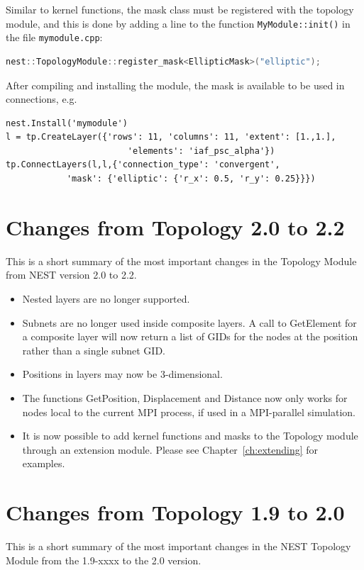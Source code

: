 \documentclass[a4paper,12pt]{report}
\begin{document}
Similar to kernel functions, the mask class must be registered with the
topology module, and this is done by adding a line to the function
\lstinline!MyModule::init()! in the file \lstinline!mymodule.cpp!:
\begin{lstlisting}[language=C++]
    nest::TopologyModule::register_mask<EllipticMask>("elliptic");
\end{lstlisting}
After compiling and installing the module, the mask is available to be used
in connections, e.g.
\begin{lstlisting}
nest.Install('mymodule')
l = tp.CreateLayer({'rows': 11, 'columns': 11, 'extent': [1.,1.],
                        'elements': 'iaf_psc_alpha'})
tp.ConnectLayers(l,l,{'connection_type': 'convergent',
            'mask': {'elliptic': {'r_x': 0.5, 'r_y': 0.25}}})
\end{lstlisting}


\chapter{Changes from Topology 2.0 to 2.2}\label{sec:changes}

This is a short summary of the most important changes in the Topology
Module from NEST version 2.0 to 2.2.

\begin{itemize}
\item Nested layers are no longer supported.
\item Subnets are no longer used inside composite layers. A call to
  GetElement for a composite layer will now return a list of GIDs for the
  nodes at the position rather than a single subnet GID.
\item Positions in layers may now be 3-dimensional.
\item The functions GetPosition, Displacement and Distance now only works
  for nodes local to the current MPI process, if used in a MPI-parallel
  simulation.
\item It is now possible to add kernel functions and masks to the Topology
  module through an extension module. Please see Chapter~\ref{ch:extending}
  for examples.
\end{itemize}

\chapter{Changes from Topology 1.9 to 2.0}\label{sec:changes2}

This is a short summary of the most important changes in the NEST
Topology Module from the 1.9-xxxx to the 2.0 version.
\end{document}
